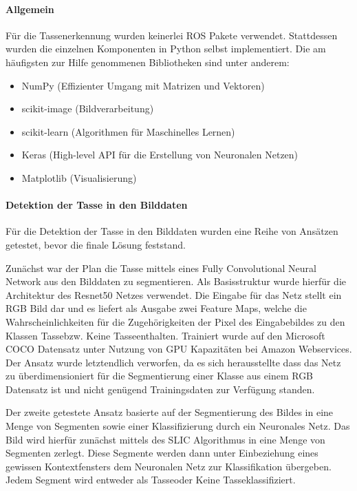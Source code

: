 \paragraph{Allgemein}
Für die Tassenerkennung wurden keinerlei ROS Pakete verwendet. Stattdessen wurden die einzelnen Komponenten in Python selbst implementiert. Die am häufigsten zur Hilfe genommenen Bibliotheken sind unter anderem:
\begin{itemize}
\item NumPy (Effizienter Umgang mit Matrizen und Vektoren)
\item scikit-image (Bildverarbeitung)
\item scikit-learn (Algorithmen für Maschinelles Lernen)
\item Keras (High-level API für die Erstellung von Neuronalen Netzen)
\item Matplotlib (Visualisierung)
\end{itemize}

\paragraph{Detektion der Tasse in den Bilddaten}
Für die Detektion der Tasse in den Bilddaten wurden eine Reihe von Ansätzen getestet, bevor die finale Lösung feststand.

Zunächst war der Plan die Tasse mittels eines Fully Convolutional Neural Network aus den Bilddaten zu segmentieren. Als Basisstruktur wurde hierfür die Architektur des Resnet50 Netzes verwendet. Die Eingabe für das Netz stellt ein RGB Bild dar und es liefert als Ausgabe zwei Feature Maps, welche die Wahrscheinlichkeiten für die Zugehörigkeiten der Pixel des Eingabebildes zu den Klassen \glqq Tasse\grqq bzw. \glqq Keine Tasse\grqq enthalten. Trainiert wurde auf den Microsoft COCO Datensatz unter Nutzung von GPU Kapazitäten bei Amazon Webservices. Der Ansatz wurde letztendlich verworfen, da es sich herausstellte dass das Netz zu überdimensioniert für die Segmentierung einer Klasse aus einem RGB Datensatz ist und nicht genügend Trainingsdaten zur Verfügung standen.

Der zweite getestete Ansatz basierte auf der Segmentierung des Bildes in eine Menge von Segmenten sowie einer Klassifizierung durch ein Neuronales Netz. Das Bild wird hierfür zunächst mittels des SLIC Algorithmus in eine Menge von Segmenten zerlegt. Diese Segmente werden dann unter Einbeziehung eines gewissen Kontextfensters dem Neuronalen Netz zur Klassifikation übergeben. Jedem Segment wird entweder als \glqq Tasse\grqq oder \glqq Keine Tasse\grqq klassifiziert.

